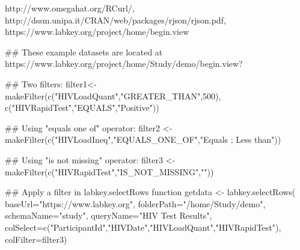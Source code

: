 \begin{References}\relax
http://www.omegahat.org/RCurl/, \\
http://dssm.unipa.it/CRAN/web/packages/rjson/rjson.pdf,\\
https://www.labkey.org/project/home/begin.view
\end{References}
\begin{SeeAlso}\relax
{}
\end{SeeAlso}
\begin{Examples}
\begin{ExampleCode}
## These example datasets are located at https://www.labkey.org/project/home/Study/demo/begin.view?

## Two filters:
filter1<- makeFilter(c("HIVLoadQuant","GREATER_THAN",500), c("HIVRapidTest","EQUALS","Positive"))

## Using "equals one of" operator:
filter2 <- makeFilter(c("HIVLoadIneq","EQUALS_ONE_OF","Equals ; Less than"))

## Using "is not missing" operator:
filter3 <- makeFilter(c("HIVRapidTest","IS_NOT_MISSING","")) 

## Apply a filter in labkey.selectRows function
getdata <- labkey.selectRows(
baseUrl="https://www.labkey.org", 
folderPath="/home/Study/demo", 
schemaName="study", 
queryName="HIV Test Results", 
colSelect=c("ParticipantId","HIVDate","HIVLoadQuant","HIVRapidTest"), 
colFilter=filter3)


\end{ExampleCode}
\end{Examples}

